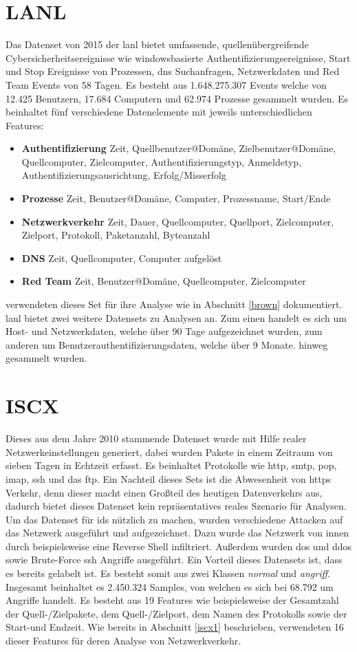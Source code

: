\documentclass[
    12pt, %
    DIV10,
    ngerman, %
    a4paper, %
    oneside, %
    titlepage, %
    parskip=half, %
    headings=normal, %
    listof=totoc, %
    bibliography=totoc, %
    index=totoc, %
    captions=tableheading, %
    final %
]{scrreprt}
\begin{document}
\section{LANL}
Das Datenset von 2015 der \acl{lanl} \parencite{akent-2015-enterprise-data} bietet umfassende, quellenübergreifende Cybersicherheitsereignisse wie windowsbasierte Authentifizierungsereignisse, Start und Stop Ereignisse von Prozessen, \ac{dns} Suchanfragen, Netzwerkdaten und Red Team Events von 58 Tagen. Es besteht aus 1.648.275.307 Events welche von 12.425 Benutzern, 17.684 Computern und 62.974 Prozesse gesammelt wurden. Es beinhaltet fünf verschiedene Datenelemente mit jeweils unterschiedlichen Features:
\begin{itemize}
\item \textbf{Authentifizierung} Zeit, Quellbenutzer@Domäne, Zielbenutzer@Domäne, Quellcomputer, Zielcomputer, Authentifizierungstyp, Anmeldetyp, Authentifizierungsausrichtung, Erfolg/Misserfolg
\item \textbf{Prozesse} Zeit, Benutzer@Domäne, Computer, Prozessname, Start/Ende
\item \textbf{Netzwerkverkehr} Zeit, Dauer, Quellcomputer, Quellport, Zielcomputer, Zielport, Protokoll, Paketanzahl, Byteanzahl
\item \textbf{DNS} Zeit, Quellcomputer, Computer aufgelöst
\item \textbf{Red Team} Zeit, Benutzer@Domäne, Quellcomputer, Zielcomputer
\end{itemize}
\textcite{Brown2018} verwendeten dieses Set für ihre Analyse wie in Abschnitt \ref{brown} dokumentiert.
\ac{lanl} bietet zwei weitere Datensets zu Analysen an. Zum einen handelt es sich um Host- und Netzwerkdaten, welche über 90 Tage aufgezeichnet wurden, zum anderen um Benutzerauthentifizierungsdaten, welche über 9 Monate.  hinweg gesammelt wurden.
\section{ISCX}
Dieses aus dem Jahre 2010 stammende Datenset wurde mit Hilfe realer Netzwerkeinstellungen generiert, dabei wurden Pakete in einem Zeitraum von sieben Tagen in Echtzeit erfasst. Es beinhaltet Protokolle wie \ac{http}, \ac{smtp}, \ac{pop}, \ac{imap}, \ac{ssh} und das \ac{ftp}. Ein Nachteil dieses Sets ist die Abwesenheit von \ac{https} Verkehr, denn dieser macht einen Großteil des heutigen Datenverkehrs aus, dadurch bietet dieses Datenset kein repräsentatives reales Szenario für Analysen. Um das Datenset für \ac{ids} nützlich zu machen, wurden verschiedene Attacken auf das Netzwerk ausgeführt und aufgezeichnet. Dazu wurde das Netzwerk von innen durch beispielsweise eine Reverse Shell infiltriert. Außerdem wurden \ac{dos} und \ac{ddos} sowie Brute-Force \ac{ssh} Angriffe ausgeführt. Ein Vorteil dieses Datensets ist, dass es bereits gelabelt ist. Es besteht somit aus zwei Klassen \emph{normal} und \emph{angriff}. Insgesamt beinhaltet es 2.450.324 Samples, von welchen es sich bei 68.792 um Angriffe handelt. Es besteht aus 19 Features wie beispielsweise der Gesamtzahl der Quell-/Zielpakete, dem Quell-/Zielport, dem Namen des Protokolls sowie der Start-und Endzeit. Wie bereits in Abschnitt \ref{iscx1} beschrieben, verwendeten \textcite{Aldwairi2018} 16 dieser Features für deren Analyse von Netzwerkverkehr.
\end{document}
